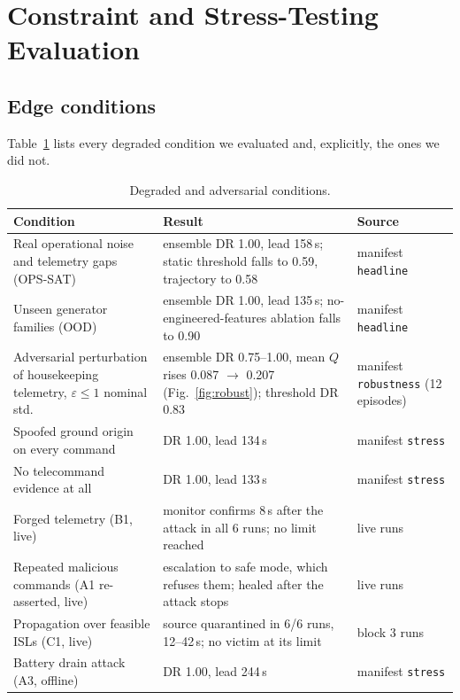 \documentclass[10pt,a4paper]{article}
\begin{document}
\section{Constraint and Stress-Testing Evaluation}
\label{sec:stress}

\subsection{Edge conditions}
Table~\ref{tab:edge} lists every degraded condition we evaluated and, explicitly, the ones we did not.

\begin{table}[ht]
\centering
\caption{Degraded and adversarial conditions.}
\label{tab:edge}
\small
\begin{tabular}{@{}>{\raggedright\arraybackslash}p{}>{\raggedright\arraybackslash}p{}>{\raggedright\arraybackslash}p{}@{}}
\toprule
Condition & Result & Source \\
\midrule
Real operational noise and telemetry gaps (OPS-SAT) & ensemble DR 1.00, lead 158\,s; static threshold falls to 0.59, trajectory to 0.58 & manifest \texttt{headline} \\
Unseen generator families (OOD) & ensemble DR 1.00, lead 135\,s; no-engineered-features ablation falls to 0.90 & manifest \texttt{headline} \\
Adversarial perturbation of housekeeping telemetry, $\varepsilon\le 1$ nominal std. & ensemble DR 0.75--1.00, mean $Q$ rises 0.087 $\rightarrow$ 0.207 (Fig.~\ref{fig:robust}); threshold DR 0.83 & manifest \texttt{robustness} (12 episodes) \\
Spoofed ground origin on every command & DR 1.00, lead 134\,s & manifest \texttt{stress} \\
No telecommand evidence at all & DR 1.00, lead 133\,s & manifest \texttt{stress} \\
Forged telemetry (B1, live) & monitor confirms 8\,s after the attack in all 6 runs; no limit reached & live runs \\
Repeated malicious commands (A1 re-asserted, live) & escalation to safe mode, which refuses them; healed after the attack stops & live runs \\
Propagation over feasible ISLs (C1, live) & source quarantined in 6/6 runs, 12--42\,s; no victim at its limit & block 3 runs \\
Battery drain attack (A3, offline) & DR 1.00, lead 244\,s & manifest \texttt{stress} \\

\end{tabular}
\end{table}
\end{document}

